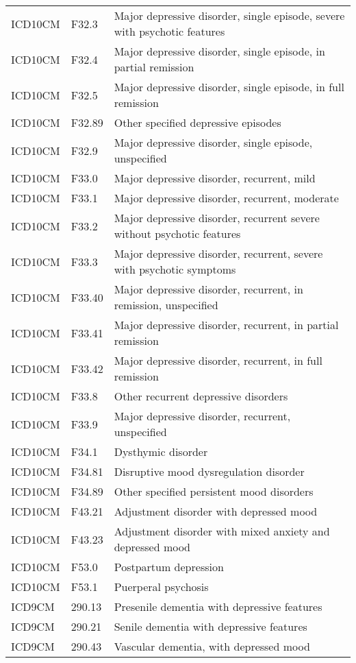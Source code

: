 \begin{longtable}{p{}p{}p{}}
  ICD10CM & F32.3 & Major depressive disorder, single episode, severe with psychotic features \\ 
  ICD10CM & F32.4 & Major depressive disorder, single episode, in partial remission \\ 
  ICD10CM & F32.5 & Major depressive disorder, single episode, in full remission \\ 
  ICD10CM & F32.89 & Other specified depressive episodes \\ 
  ICD10CM & F32.9 & Major depressive disorder, single episode, unspecified \\ 
  ICD10CM & F33.0 & Major depressive disorder, recurrent, mild \\ 
  ICD10CM & F33.1 & Major depressive disorder, recurrent, moderate \\ 
  ICD10CM & F33.2 & Major depressive disorder, recurrent severe without psychotic features \\ 
  ICD10CM & F33.3 & Major depressive disorder, recurrent, severe with psychotic symptoms \\ 
  ICD10CM & F33.40 & Major depressive disorder, recurrent, in remission, unspecified \\ 
  ICD10CM & F33.41 & Major depressive disorder, recurrent, in partial remission \\ 
  ICD10CM & F33.42 & Major depressive disorder, recurrent, in full remission \\ 
  ICD10CM & F33.8 & Other recurrent depressive disorders \\ 
  ICD10CM & F33.9 & Major depressive disorder, recurrent, unspecified \\ 
  ICD10CM & F34.1 & Dysthymic disorder \\ 
  ICD10CM & F34.81 & Disruptive mood dysregulation disorder \\ 
  ICD10CM & F34.89 & Other specified persistent mood disorders \\ 
  ICD10CM & F43.21 & Adjustment disorder with depressed mood \\ 
  ICD10CM & F43.23 & Adjustment disorder with mixed anxiety and depressed mood \\ 
  ICD10CM & F53.0 & Postpartum depression \\ 
  ICD10CM & F53.1 & Puerperal psychosis \\ 
  ICD9CM & 290.13 & Presenile dementia with depressive features \\ 
  ICD9CM & 290.21 & Senile dementia with depressive features \\ 
  ICD9CM & 290.43 & Vascular dementia, with depressed mood \\ 

\end{longtable}
